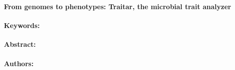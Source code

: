 \noindent
\large {\bf From genomes to phenotypes: Traitar, the microbial trait analyzer} 


\normalsize 


\noindent \paragraph{Keywords:} 

\noindent \paragraph{Abstract:} 



\noindent \paragraph{Authors:} 


